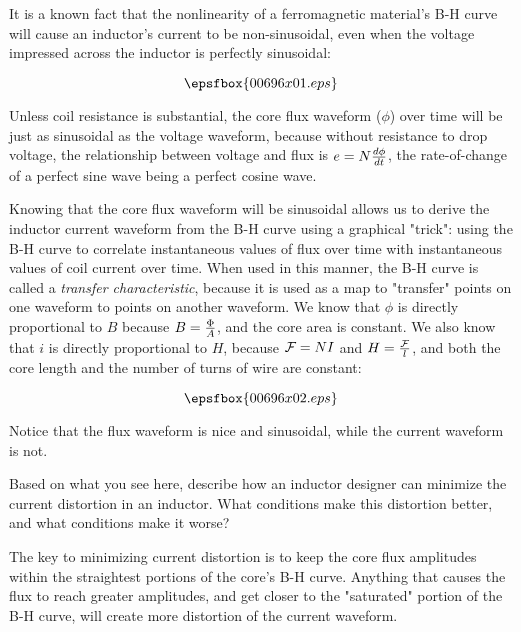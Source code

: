 

It is a known fact that the nonlinearity of a ferromagnetic material's B-H curve will cause an inductor's current to be non-sinusoidal, even when the voltage impressed across the inductor is perfectly sinusoidal:

$$\epsfbox{00696x01.eps}$$

Unless coil resistance is substantial, the core flux waveform ($\phi$) over time will be just as sinusoidal as the voltage waveform, because without resistance to drop voltage, the relationship between voltage and flux is $e = N{d\phi \over dt}$, the rate-of-change of a perfect sine wave being a perfect cosine wave.  

Knowing that the core flux waveform will be sinusoidal allows us to derive the inductor current waveform from the B-H curve using a graphical "trick": using the B-H curve to correlate instantaneous values of flux over time with instantaneous values of coil current over time.  When used in this manner, the B-H curve is called a {\it transfer characteristic}, because it is used as a map to "transfer" points on one waveform to points on another waveform.  We know that $\phi$ is directly proportional to $B$ because $B = {\Phi \over A}$, and the core area is constant.  We also know that $i$ is directly proportional to $H$, because ${\cal F} = NI$ and $H = {{\cal F} \over l}$, and both the core length and the number of turns of wire are constant:

$$\epsfbox{00696x02.eps}$$

Notice that the flux waveform is nice and sinusoidal, while the current waveform is not.

\vskip 10pt

Based on what you see here, describe how an inductor designer can minimize the current distortion in an inductor.  What conditions make this distortion better, and what conditions make it worse?







The key to minimizing current distortion is to keep the core flux amplitudes within the straightest portions of the core's B-H curve.  Anything that causes the flux to reach greater amplitudes, and get closer to the "saturated" portion of the B-H curve, will create more distortion of the current waveform.

